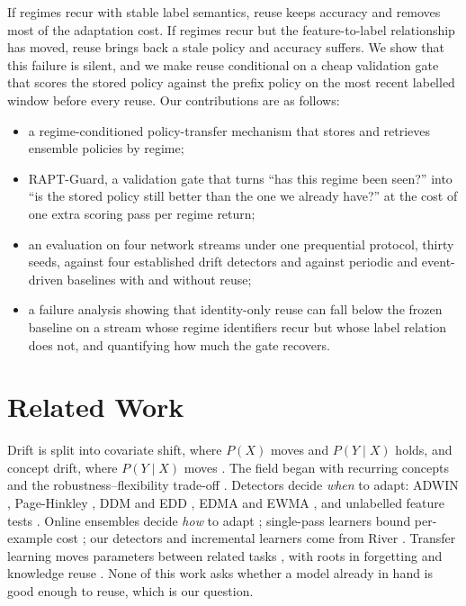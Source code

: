 \documentclass[conference]{IEEEtran}
\begin{document}
If regimes recur with stable label semantics, reuse keeps accuracy and removes most of the
adaptation cost. If regimes recur but the feature-to-label relationship has moved, reuse
brings back a stale policy and accuracy suffers. We show that this failure is silent, and
we make reuse conditional on a cheap validation gate that scores the stored policy
against the prefix policy on the most recent labelled window before every reuse. Our
contributions are as follows:
\begin{itemize}
\item a regime-conditioned policy-transfer mechanism that stores and retrieves ensemble
policies by regime;
\item RAPT-Guard, a validation gate that turns ``has this regime been seen?'' into ``is
the stored policy still better than the one we already have?'' at the cost of one extra
scoring pass per regime return;
\item an evaluation on four network streams under one prequential protocol, thirty seeds,
against four established drift detectors and against periodic and event-driven baselines
with and without reuse;
\item a failure analysis showing that identity-only reuse can fall below the frozen
baseline on a stream whose regime identifiers recur but whose label relation does not,
and quantifying how much the gate recovers.
\end{itemize}


\section{Related Work}
Drift is split into covariate shift, where $P(X)$ moves and $P(Y\mid X)$ holds, and
concept drift, where $P(Y\mid X)$ moves \cite{gama2004learning,lu2018learning}. The field
began with recurring concepts \cite{schlimmer1986incremental} and the
robustness--flexibility trade-off \cite{widmer1994combining}. Detectors decide \emph{when}
to adapt: ADWIN \cite{bifet2007learning}, Page-Hinkley \cite{page1954continuous}, DDM and
EDD \cite{gama2004learning,baena2006early}, EDMA and EWMA \cite{ross2012exponentially},
and unlabelled feature tests \cite{frias2014online,dos2016fast,brockhoff2020time}. Online
ensembles decide \emph{how} to adapt
\cite{JMLR:v8:kolter07a,gomes2017adaptive,brzezinski2013reacting}; single-pass learners
bound per-example cost \cite{domingos2000mining}; our detectors and incremental learners
come from River \cite{montiel2021river}. Transfer learning moves parameters between
related tasks \cite{pan2010transfer}, with roots in forgetting \cite{markovitch1988role}
and knowledge reuse \cite{tambe1988some}. None of this work asks whether a model already
in hand is good enough to reuse, which is our question.
\end{document}

